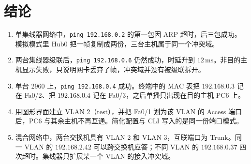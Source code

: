 \documentclass[10.5pt,a4paper,UTF8]{article}
\begin{document}
\section{结论}
\begin{enumerate}[leftmargin=2em]
    \item 单集线器网络中，\texttt{ping 192.168.0.2} 的第一包因 ARP 超时，后三包成功。模拟模式里 Hub0 把一帧复制成两份，三台主机属于同一个冲突域。
    \item 两台集线器级联后，\texttt{ping 192.168.0.6} 仍然成功，时延升到 $12\,\mathrm{ms}$。非目的主机显示失败，只说明网卡丢弃了帧，冲突域并没有被级联拆开。
    \item 单台 2960 上，\texttt{ping 192.168.0.4} 成功。终端中的 MAC 表把 $192.168.0.3$ 记在 Fa0/2、把 $192.168.0.4$ 记在 Fa0/3，之后单播只出现在目的主机 PC6 上。
    \item 用图形界面建立 VLAN 2（test），并把 Fa0/1 划为该 VLAN 的 Access 端口后，PC6 与其余主机不再互通。简化配置与 CLI 写入的是同一份端口模式。
    \item 混合网络中，两台交换机具有 VLAN 2 和 VLAN 3，互联端口为 Trunk。同一 VLAN 的 $192.168.2.42$ 可以跨交换机应答；不同 VLAN 的 $192.168.0.37$ 四次超时。集线器只扩展某一个 VLAN 的接入冲突域。
\end{enumerate}
\end{document}
